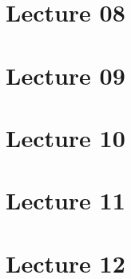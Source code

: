 \documentclass[12pt, a4paper]{scrartcl}
\begin{document}
\section{Lecture 08}





\clearpage
\section{Lecture 09}



\clearpage
\section{Lecture 10}



\clearpage
\section{Lecture 11}




\clearpage
\section{Lecture 12}



%

\clearpage
\nocite{*}


\end{document}
